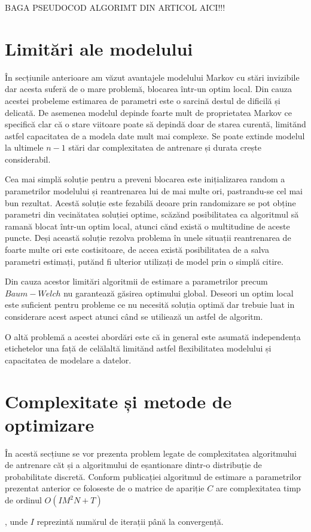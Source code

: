 BAGA PSEUDOCOD ALGORIMT DIN ARTICOL AICI!!!\par

\section{Limitări ale modelului}

În secțiunile anterioare am văzut avantajele modelului Markov cu stări invizibile dar acesta suferă de o mare problemă, blocarea într-un optim local. Din cauza acestei probeleme estimarea de parametri este o sarcină destul de dificilă și delicată. De asemenea modelul depinde foarte mult de proprietatea Markov ce specifică clar că o stare viitoare poate să depindă doar de starea curentă, limitănd astfel capacitatea de a modela date mult mai complexe. Se poate extinde modelul la ultimele $n-1$ stări dar complexitatea de antrenare și durata crește considerabil.
\par

Cea mai simplă soluție pentru a preveni blocarea este inițializarea random a parametrilor modelului și reantrenarea lui de mai multe ori, pastrandu-se cel mai bun rezultat. Acestă soluție este fezabilă deoare prin randomizare se pot obține parametri din vecinătatea soluției optime, scăzănd posibilitatea ca algoritmul să ramană blocat într-un optim local, atunci cănd există o multitudine de aceste puncte. Deși această soluție rezolva problema în unele situații reantrenarea de foarte multe ori este costisitoare, de accea există posibilitatea de a salva parametri estimați, putănd fi ulterior utilizați de model prin o simplă citire.\par

Din cauza acestor limitări algoritmii de estimare a parametrilor precum $Baum-Welch$ nu garantează găsirea optimului global. Deseori un optim local este suficient pentru probleme ce nu necesită soluția optimă dar trebuie luat in considerare acest aspect atunci când se utiliează un astfel de algoritm.\par

O altă problemă a acestei abordări este că in general este asumată independența etichetelor una față de celălaltă limitănd astfel flexibilitatea modelului și capacitatea de modelare a datelor.\par

\section{Complexitate și metode de optimizare}
În acestă secțiune se vor prezenta problem legate de complexitatea algoritmului de antrenare căt și a algoritmului de eșantionare dintr-o distribuție de probabilitate discretă. Conform publicației algoritmul de estimare a parametrilor prezentat anterior ce foloseste de o matrice de apariție $C$ are complexitatea timp de ordinul $O(IM^{2}N + T)$\par, unde $I$ reprezintă numărul de iterații până la convergență.\par

